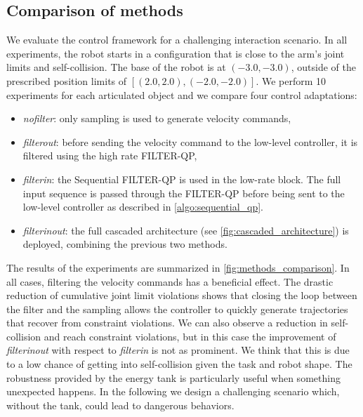 \subsection{Comparison of methods}
We evaluate the control framework for a challenging interaction scenario. In all experiments, the robot starts in a configuration that is close to the arm's joint limits and self-collision. The base of the robot is at $(-3.0, -3.0)$, outside of the prescribed position limits of $[(2.0, 2.0), (-2.0, -2.0)]$. We perform 10 experiments for each articulated object and we compare four control adaptations:
\begin{itemize}
    \item \textit{no\textunderscore filter}: only sampling is used to generate velocity commands,
    \item \textit{filter\textunderscore out}: before sending the velocity command to the low-level controller, it is filtered using the high rate FILTER-QP,
    \item \textit{filter\textunderscore in}: the Sequential FILTER-QP is used in the low-rate block. The full input sequence is passed through the FILTER-QP before being sent to the low-level controller as described in \algo \ref{algo:sequential_qp}.
    \item \textit{filter\textunderscore in\textunderscore out}: the full cascaded architecture (see \fig \ref{fig:cascaded_architecture}) is deployed, combining the previous two methods.
\end{itemize}
The results of the experiments are summarized in \fig \ref{fig:methods_comparison}. In all cases, filtering the velocity commands has a beneficial effect. The drastic reduction of cumulative joint limit violations shows that closing the loop between the filter and the sampling allows the controller to quickly generate trajectories that recover from constraint violations. We can also observe a reduction in self-collision and reach constraint violations, but in this case the improvement of  \textit{filter\textunderscore in\textunderscore out} with respect to \textit{filter\textunderscore in} is not as prominent. We think that this is due to a low chance of getting into self-collision given the task and robot shape. The robustness provided by the energy tank is particularly useful when something unexpected happens. In the following we design a challenging scenario which, without the tank, could lead to dangerous behaviors. 
